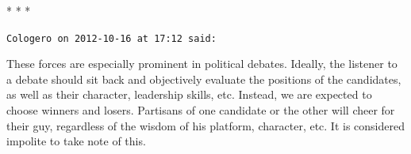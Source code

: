 
\begin{center}* * *\end{center}

\begin{footnotesize}
\begin{sffamily}
\texttt{Cologero on 2012-10-16 at 17:12 said:}

These forces are especially prominent in political debates. Ideally, the listener to a debate should sit back and objectively evaluate the positions of the candidates, as well as their character, leadership skills, etc. Instead, we are expected to choose winners and losers. Partisans of one candidate or the other will cheer for their guy, regardless of the wisdom of his platform, character, etc. It is considered impolite to take note of this.


\hfill

\end{sffamily}
\end{footnotesize}

